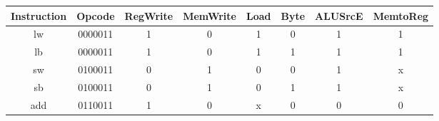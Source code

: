 \documentclass{article}
\begin{document}
\begin{landscape}
\begin{center}
    \begin{tabular}{||c c c c c c c c||} 
         \hline
         Instruction & Opcode & RegWrite & MemWrite & Load & Byte & ALUSrcE & MemtoReg \\ [0.5ex] 
         \hline\hline
         lw & 0000011 & 1 & 0 & 1 & 0 & 1 & 1 \\ 
         \hline
         lb & 0000011 & 1 & 0 & 1 & 1 & 1 & 1 \\ 
         \hline
         sw & 0100011 & 0 & 1 & 0 & 0 & 1 & x \\ 
         \hline
         sb & 0100011 & 0 & 1 & 0 & 1 & 1 & x \\ 
         \hline
         add & 0110011 & 1 & 0 & x & 0 & 0 & 0 \\ 
         \hline
    \end{tabular}
\end{center}
\end{landscape}
\end{document}
